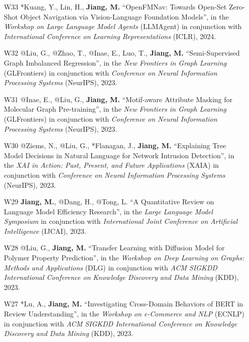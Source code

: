 \documentclass[10pt]{article}
\newenvironment{myindentpar}[1]%
{\begin{list}{}%
         {\setlength{\leftmargin}{#1}}%
         \item[]%
}
{\end{list}}
\newcounter{list}
\begin{document}
\begin{myindentpar}{0.00cm}
\begin{enumerate}[leftmargin=.5cm]
\item[W33] *Kuang, Y., Lin, H., \textbf{Jiang, M.} ``OpenFMNav: Towards Open-Set Zero-Shot Object Navigation via Vision-Language Foundation Models'', in the \textit{Workshop on Large Language Model Agents} (LLMAgent) in conjunction with \textit{International Conference on Learning Representations} (ICLR), 2024.

\item[W32] @Liu, G., @Zhao, T., @Inae, E., Luo, T., \textbf{Jiang, M.} ``Semi-Supervised Graph Imbalanced Regression'', in the \textit{New Frontiers in Graph Learning} (GLFrontiers) in conjunction with \textit{Conference on Neural Information Processing Systems} (NeurIPS), 2023.

\item[W31] @Inae, E., @Liu, G., \textbf{Jiang, M.} ``Motif-aware Attribute Masking for Molecular Graph Pre-training'', in the \textit{New Frontiers in Graph Learning} (GLFrontiers) in conjunction with \textit{Conference on Neural Information Processing Systems} (NeurIPS), 2023.

\item[W30] @Ziems, N., @Liu, G., *Flanagan, J., \textbf{Jiang, M.} ``Explaining Tree Model Decisions in Natural Language for Network Intrusion Detection'', in the \textit{XAI in Action: Past, Present, and Future Applications} (XAIA) in conjunction with \textit{Conference on Neural Information Processing Systems} (NeurIPS), 2023.

\item[W29] \textbf{Jiang, M.}, @Dang, H., @Tong, L. ``A Quantitative Review on Language Model Efficiency Research'', in the \textit{Large Language Model Symposium} in conjunction with \textit{International Joint Conference on Artificial Intelligence} (IJCAI), 2023.

\item[W28] @Liu, G., \textbf{Jiang, M.} ``Transfer Learning with Diffusion Model for Polymer Property Prediction'', in the \textit{Workshop on Deep Learning on Graphs: Methods and Applications} (DLG) in conjunction with \textit{ACM SIGKDD International Conference on Knowledge Discovery and Data Mining} (KDD), 2023.

\item[W27] *Lu, A., \textbf{Jiang, M.} ``Investigating Cross-Domain Behaviors of BERT in Review Understanding'', in the \textit{Workshop on e-Commerce and NLP} (ECNLP) in conjunction with \textit{ACM SIGKDD International Conference on Knowledge Discovery and Data Mining} (KDD), 2023.


\end{enumerate}
\end{myindentpar}
\end{document}
